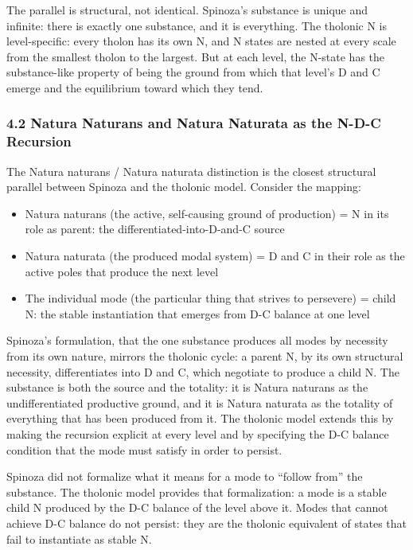 \documentclass[
  11pt,
  letterpaper,
]{article}
\providecommand{\tightlist}{%
  \setlength{\itemsep}{0pt}\setlength{\parskip}{0pt}}
\begin{document}
The parallel is structural, not identical. Spinoza's substance is unique
and infinite: there is exactly one substance, and it is everything. The
tholonic N is level-specific: every tholon has its own N, and N states
are nested at every scale from the smallest tholon to the largest. But
at each level, the N-state has the substance-like property of being the
ground from which that level's D and C emerge and the equilibrium toward
which they tend.

\subsubsection{4.2 Natura Naturans and Natura Naturata as the N-D-C
Recursion}\label{natura-naturans-and-natura-naturata-as-the-n-d-c-recursion}

The Natura naturans / Natura naturata distinction is the closest
structural parallel between Spinoza and the tholonic model. Consider the
mapping:

\begin{itemize}
\tightlist
\item
  Natura naturans (the active, self-causing ground of production) = N in
  its role as parent: the differentiated-into-D-and-C source
\item
  Natura naturata (the produced modal system) = D and C in their role as
  the active poles that produce the next level
\item
  The individual mode (the particular thing that strives to persevere) =
  child N: the stable instantiation that emerges from D-C balance at one
  level
\end{itemize}

Spinoza's formulation, that the one substance produces all modes by
necessity from its own nature, mirrors the tholonic cycle: a parent N,
by its own structural necessity, differentiates into D and C, which
negotiate to produce a child N. The substance is both the source and the
totality: it is Natura naturans as the undifferentiated productive
ground, and it is Natura naturata as the totality of everything that has
been produced from it. The tholonic model extends this by making the
recursion explicit at every level and by specifying the D-C balance
condition that the mode must satisfy in order to persist.

Spinoza did not formalize what it means for a mode to ``follow from''
the substance. The tholonic model provides that formalization: a mode is
a stable child N produced by the D-C balance of the level above it.
Modes that cannot achieve D-C balance do not persist: they are the
tholonic equivalent of states that fail to instantiate as stable N.
\end{document}
